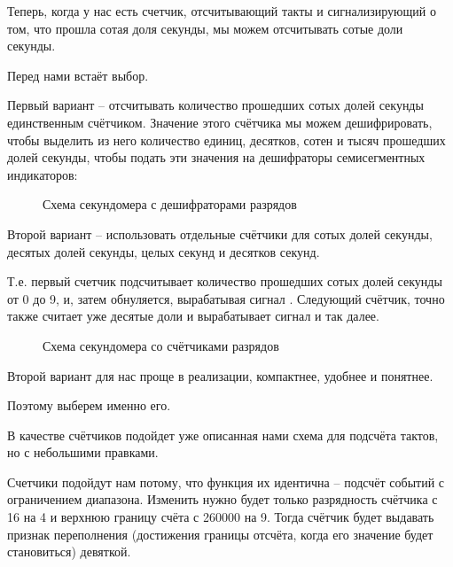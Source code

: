 

\par{Теперь, когда у нас есть счетчик, отсчитывающий такты и сигнализирующий о том, что прошла сотая доля секунды, мы можем отсчитывать сотые доли секунды.}

\par{Перед нами встаёт выбор.}

\par{Первый вариант – отсчитывать количество прошедших сотых долей секунды единственным счётчиком. Значение этого счётчика мы можем дешифрировать, чтобы выделить из него количество единиц, десятков, сотен и тысяч прошедших долей секунды, чтобы подать эти значения на дешифраторы семисегментных индикаторов:}

\begin{figure}[H]
	\centering
	\def\svgwidth{\columnwidth}
	
	\caption{Схема секундомера с дешифраторами разрядов}
\end{figure}

\par{Второй вариант – использовать отдельные счётчики для сотых долей секунды, десятых долей секунды, целых секунд и десятков секунд.}

\par{Т.е. первый счетчик подсчитывает количество прошедших сотых долей секунды от 0 до 9, и, затем обнуляется, вырабатывая сигнал . Следующий счётчик, точно также считает уже десятые доли и вырабатывает сигнал  и так далее.}

\begin{figure}[H]
	\centering
	\def\svgwidth{\columnwidth}
	
	\caption{Схема секундомера со счётчиками разрядов}
\end{figure}

\par{Второй вариант для нас проще в реализации, компактнее, удобнее и понятнее.}

\par{Поэтому выберем именно его.}

\par{В качестве счётчиков подойдет уже описанная нами схема для подсчёта тактов, но с небольшими правками.}

\par{Счетчики подойдут нам потому, что функция их идентична – подсчёт событий с ограничением диапазона. Изменить нужно будет только разрядность счётчика с 16 на 4 и верхнюю границу счёта с 260000 на 9. Тогда счётчик будет выдавать признак переполнения (достижения границы отсчёта, когда его значение будет становиться) девяткой.}

